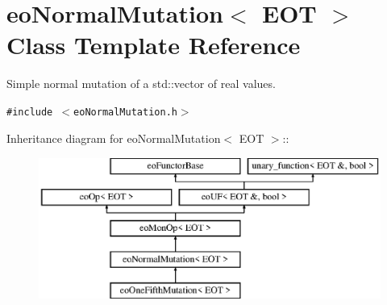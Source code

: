 \section{eo\-Normal\-Mutation$<$ EOT $>$ Class Template Reference}
\label{classeo_normal_mutation}
Simple normal mutation of a std::vector of real values.  


{\tt \#include $<$eo\-Normal\-Mutation.h$>$}

Inheritance diagram for eo\-Normal\-Mutation$<$ EOT $>$::\begin{figure}[H]
\begin{center}
\leavevmode
\includegraphics[height=4.64345cm]{classeo_normal_mutation}
\end{center}
\end{figure}
